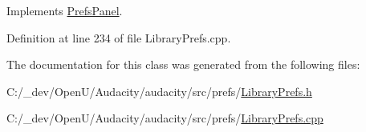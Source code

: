 Implements \hyperlink{class_prefs_panel_ab5572aedab201c47fbbdf714c6a2b781}{Prefs\+Panel}.



Definition at line 234 of file Library\+Prefs.\+cpp.



The documentation for this class was generated from the following files\+:\begin{DoxyCompactItemize}
\item 
C\+:/\+\_\+dev/\+Open\+U/\+Audacity/audacity/src/prefs/\hyperlink{_library_prefs_8h}{Library\+Prefs.\+h}\item 
C\+:/\+\_\+dev/\+Open\+U/\+Audacity/audacity/src/prefs/\hyperlink{_library_prefs_8cpp}{Library\+Prefs.\+cpp}\end{DoxyCompactItemize}
